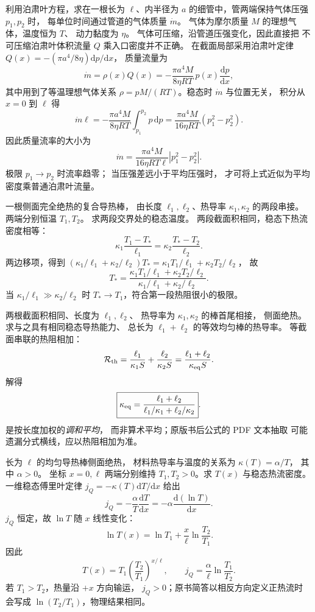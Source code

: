 利用泊肃叶方程，求在一根长为 $\ell$、内半径为 $a$
的细管中，管两端保持气体压强 $p_1,p_2$ 时，
每单位时间通过管道的气体质量 $\dot m$。
气体为摩尔质量 $M$ 的理想气体，温度恒为 $T$、
动力黏度为 $\eta$。
\exsolution
气体可压缩，沿管道压强变化，因此直接把
不可压缩泊肃叶体积流量 $Q$ 乘入口密度并不正确。
在截面局部采用泊肃叶定律
$Q(x)=-(\pi a^4/8\eta)\mathrm dp/\mathrm dx$，
质量流量为
\[
\dot m=\rho(x)Q(x)
=-\frac{\pi a^4M}{8\eta RT}\,
p(x)\frac{\mathrm dp}{\mathrm dx},
\]
其中用到了等温理想气体关系
$\rho=pM/(RT)$。稳态时 $\dot m$ 与位置无关，
积分从 $x=0$ 到 $\ell$ 得
\[
\dot m\ell
=-\frac{\pi a^4M}{8\eta RT}
\int_{p_1}^{p_2}p\,\mathrm dp
=\frac{\pi a^4M}{16\eta RT}(p_1^2-p_2^2).
\]
因此质量流率的大小为
\[
\boxed{\dot m=\frac{\pi a^4 M}{16\eta RT\ell}
|p_1^2-p_2^2|}.
\]
\excheck 极限 $p_1\to p_2$ 时流率趋零；
当压强差远小于平均压强时，
才可将上式近似为平均密度乘普通泊肃叶流量。

一根侧面完全绝热的复合导热棒，
由长度 $\ell_1,\ell_2$、热导率
$\kappa_1,\kappa_2$ 的两段串接。
两端分别恒温 $T_1,T_2$。
求两段交界处的稳态温度。
\exsolution
两段截面积相同，稳态下热流密度相等：
\[
\kappa_1\frac{T_1-T_*}{\ell_1}
=\kappa_2\frac{T_*-T_2}{\ell_2}.
\]
两边移项，得到
$(\kappa_1/\ell_1+\kappa_2/\ell_2)T_*
=\kappa_1T_1/\ell_1+\kappa_2T_2/\ell_2$，
故
\[
\boxed{T_*=
\frac{\kappa_1T_1/\ell_1+\kappa_2T_2/\ell_2}
{\kappa_1/\ell_1+\kappa_2/\ell_2}}.
\]
\excheck 当 $\kappa_1/\ell_1\gg\kappa_2/\ell_2$ 时
$T_*\to T_1$，符合第一段热阻很小的极限。

两根截面积相同、长度为 $\ell_1,\ell_2$、
热导率为 $\kappa_1,\kappa_2$ 的棒首尾相接，
侧面绝热。求与之具有相同稳态导热能力、
总长为 $\ell_1+\ell_2$ 的等效均匀棒的热导率。
\exsolution
等截面串联的热阻相加：
\[
\mathcal R_{\rm th}=
\frac{\ell_1}{\kappa_1 S}+\frac{\ell_2}{\kappa_2 S}
=\frac{\ell_1+\ell_2}{\kappa_{\rm eq}S}.
\]
解得
\[
\boxed{\kappa_{\rm eq}=
\frac{\ell_1+\ell_2}
{\ell_1/\kappa_1+\ell_2/\kappa_2}}.
\]
\excheck 是按长度加权的\emph{调和平均}，
而非算术平均；原版书后公式的 PDF 文本抽取
可能遗漏分式横线，应以热阻相加为准。

长为 $\ell$ 的均匀导热棒侧面绝热，
材料热导率与温度的关系为
$\kappa(T)=\alpha/T$，
其中 $\alpha>0$。
坐标 $x=0,\ell$ 两端分别维持
$T_1,T_2>0$。求 $T(x)$ 与稳态热流密度。
\exsolution
一维稳态傅里叶定律
$j_Q=-\kappa(T)\mathrm dT/\mathrm dx$
给出
\[
j_Q=-\frac{\alpha}{T}\frac{\mathrm dT}{\mathrm dx}
=-\alpha\frac{\mathrm d(\ln T)}{\mathrm dx}.
\]
$j_Q$ 恒定，故 $\ln T$ 随 $x$ 线性变化：
\[
\ln T(x)=\ln T_1+
\frac{x}{\ell}\ln\frac{T_2}{T_1}.
\]
因此
\[
\boxed{T(x)=T_1\left(\frac{T_2}{T_1}\right)^{x/\ell}},
\qquad
\boxed{j_Q=\frac{\alpha}{\ell}\ln\frac{T_1}{T_2}}.
\]
\excheck 若 $T_1>T_2$，热量沿 $+x$ 方向输运，
$j_Q>0$；原书简答以相反方向定义正热流时
会写成 $\ln(T_2/T_1)$，物理结果相同。

